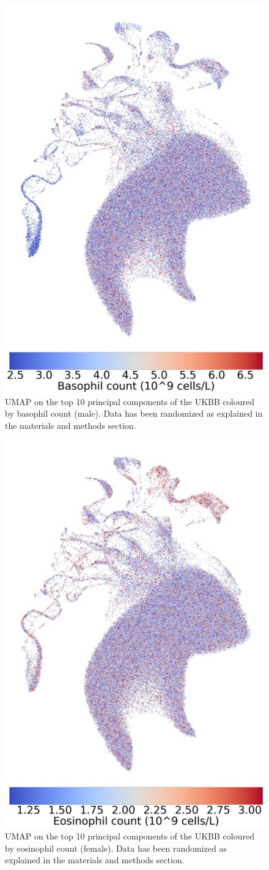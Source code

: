 \documentclass[12pt]{pnas-new}
\begin{document}
\begin{figure}
    \centering
    \includegraphics[width=0.4\columnwidth]{images/UKBB_UMAP_PC10_NN15_MD05_2018328174511_201871417039_basophill_count_pct5_m.pdf}
    \caption{UMAP on the top 10 principal components of the UKBB coloured by basophil count (male). Data has been randomized as explained in the materials and methods section.}
    \label{fig:supp_ukbb_basophill_m}
\end{figure}

\begin{figure}
    \centering
    \includegraphics[width=0.4\columnwidth]{images/UKBB_UMAP_PC10_NN15_MD05_2018328174511_201871417720_eosinophill_count_pct5_f.pdf}
    \caption{UMAP on the top 10 principal components of the UKBB coloured by eosinophil count (female). Data has been randomized as explained in the materials and methods section.}
    \label{fig:supp_ukbb_eosinophill_f}
\end{figure}
\end{document}
